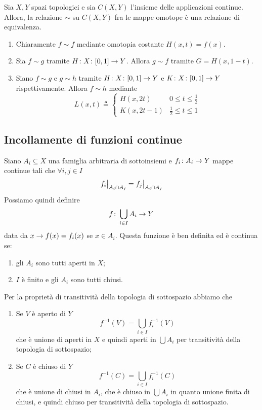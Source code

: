 \documentclass[a4paper]{article}
\begin{document}
\begin{snippetproposition}{}
    Sia \(X,Y\) spazi topologici
    e sia \(C(X,Y)\) l'insieme delle applicazioni continue.
    Allora, la relazione \(\sim\) su \(C(X,Y)\) fra
    le mappe omotope è una relazione di equivalenza.
\end{snippetproposition}

\begin{snippetproof}{}
    \begin{enumerate}
        \item Chiaramente \(f\sim f\) mediante omotopia costante \(H(x,t) = f(x)\).
        \item Sia \(f\sim g\) tramite \(H \colon X \colon [0,1] \to Y\). Allora
        \(g \sim f\) tramite \(G = H(x, 1-t)\).
        \item Siano \(f\sim g\) e \(g\sim h\) tramite \(H\colon X \colon [0,1] \to Y\)
        e \(K\colon X \colon [0,1] \to Y\) rispettivamente.
        Allora \(f\sim h\) mediante
        \[
            L(x, t) \triangleq \begin{cases}
                H(x, 2t) & 0 \leq t \leq \frac12 \\
                K(x, 2t-1) & \frac12 \leq t \leq 1
            \end{cases}
        \]
    \end{enumerate}
\end{snippetproof}

\subsection{Incollamente di funzioni continue}

Siano \(A_i \subseteq X\) una famiglia arbitraria di sottoinsiemi
e \(f_i \colon A_i \to Y\) mappe continue
tali che \(\forall i,j \in I\)
\[
    \restr{f_i}{A_i \intersection A_j} = \restr{f_j}{A_i \intersection A_j}
\]
Possiamo quindi definire
\[
    f \colon \bigcup_{i \in I} A_i \to Y
\]
data da \(x \to f(x) = f_i(x)\) se \(x\in A_i\).
Questa funzione è ben definita ed è continua se:
\begin{enumerate}
    \item gli \(A_i\) sono tutti aperti in \(X\);
    \item \(I\) è finito e gli \(A_i\) sono tutti chiusi.
\end{enumerate}
Per la proprietà di transitività della topologia di sottospazio abbiamo che
\begin{enumerate}
    \item Se \(V\) è aperto di \(Y\)
    \[
        f^{-1}(V) = \bigcup_{i\in I} f_i^{-1}(V)
    \]
    che è unione di aperti in \(X\) e quindi aperti in \(\bigcup A_i\) per transitività della topologia di sottospazio;
    \item Se \(C\) è chiuso di \(Y\)
    \[
        f^{-1}(C) = \bigcup_{i\in I} f_i^{-1}(C)
    \]
    che è unione di chiusi in \(A_i\), che è chiuso in \(\bigcup A_i\) in quanto unione
    finita di chiusi, e quindi chiuso per transitività della topologia di sottospazio.
\end{enumerate}
\end{document}
